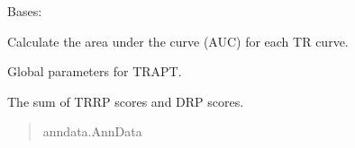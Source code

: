 \documentclass[letterpaper,10pt,english]{sphinxmanual}
\begin{document}
\begin{fulllineitems}
\label{\detokenize{index:TRAPT.CalcTRAUC.CalcTRAUC}}
\pysigstartsignatures
{}
\pysigstopsignatures
\sphinxAtStartPar
Bases: 

\sphinxAtStartPar
Calculate the area under the curve (AUC) for each TR curve.

\begin{fulllineitems}
\label{\detokenize{index:TRAPT.CalcTRAUC.CalcTRAUC.args}}
\pysigstartsignatures
{}
\pysigstopsignatures
\sphinxAtStartPar
Global parameters for TRAPT.
\begin{quote}\begin{description}
\sphinxAtStartPar
{\hyperref[\detokenize{index:TRAPT.Tools.Args}]{}}

\end{description}\end{quote}

\end{fulllineitems}


\begin{fulllineitems}
\label{\detokenize{index:TRAPT.CalcTRAUC.CalcTRAUC.RP_Matrix_TR_Sample}}
\pysigstartsignatures
{}
\pysigstopsignatures
\sphinxAtStartPar
The sum of TR\sphinxhyphen{}RP scores and D\sphinxhyphen{}RP scores.
\begin{quote}\begin{description}
\sphinxAtStartPar
anndata.AnnData

\end{description}\end{quote}

\end{fulllineitems}



\end{fulllineitems}
\end{document}
